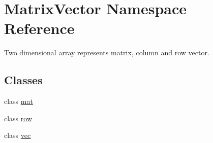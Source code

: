 \hypertarget{namespace_matrix_vector}{}\section{Matrix\+Vector Namespace Reference}
\label{namespace_matrix_vector}


Two dimensional array represents matrix, column and row vector.  


\subsection*{Classes}
\begin{DoxyCompactItemize}
\item 
class \mbox{\hyperlink{class_matrix_vector_1_1mat}{mat}}
\item 
class \mbox{\hyperlink{class_matrix_vector_1_1row}{row}}
\item 
class \mbox{\hyperlink{class_matrix_vector_1_1vec}{vec}}
\end{DoxyCompactItemize}
